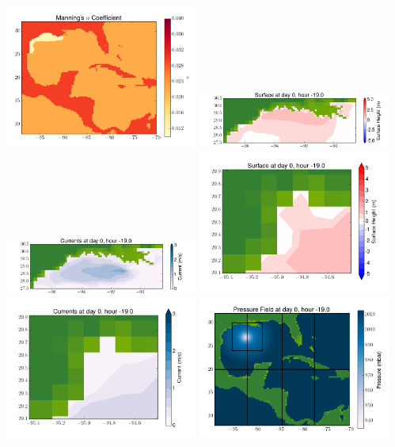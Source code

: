 \documentclass[11pt]{article}
\begin{document}
\vskip 10pt 
\includegraphics[width=0.475\textwidth]{frame0053fig3.png}
\includegraphics[width=0.475\textwidth]{frame0053fig4.png}
\vskip 10pt 
\includegraphics[width=0.475\textwidth]{frame0053fig5.png}
\includegraphics[width=0.475\textwidth]{frame0053fig6.png}
\vskip 10pt 
\includegraphics[width=0.475\textwidth]{frame0053fig7.png}
\includegraphics[width=0.475\textwidth]{frame0053fig8.png}
\end{document}

